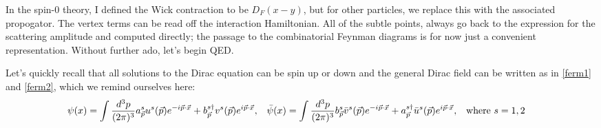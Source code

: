 \documentclass{report}
\theoremstyle{plain}
\theoremstyle{definition}
\theoremstyle{remark}
\newcommand{\FR}[2]{\frac{#1}{#2}}
\newcommand{\ha} { a}
\newcommand{\hb} { b}
\begin{document}
In the spin-0 theory, I defined the Wick contraction to be $D_F(x-y)$,
but for other particles, we replace this with the associated propogator.
The vertex terms can be read off the interaction Hamiltonian. All of the
subtle points, always go back to the expression for the scattering
amplitude and computed directly; the passage to the combinatorial Feynman
diagrams is for now just a convenient representation. Without further ado,
let's begin QED. 

Let's quickly recall that all solutions to the Dirac equation can be spin
up or down and the general Dirac field can be written as in \eqref{ferm1}
and \eqref{ferm2}, which we remind ourselves here:
\begin{align*} 
\psi(x) &= \int \FR{d^3p}{(2\pi)^3} 
\ha^{s}_\vp u^s(\vp) e^{-i\vp\cdot\vx} +
\hb^{s\dag}_\vp v^s(\vp) e^{i\vp\cdot\vx}, &
\bar\psi(x) &= \int \FR{d^3p}{(2\pi)^3} 
\hb^{s}_\vp \bar v^s(\vp) e^{-i\vp\cdot\vx} +
\ha^{s\dag}_\vp \bar u^s(\vp) e^{i\vp\cdot\vx}, & \text{where}\ s&=1,2
\end{align*}
\end{document}
